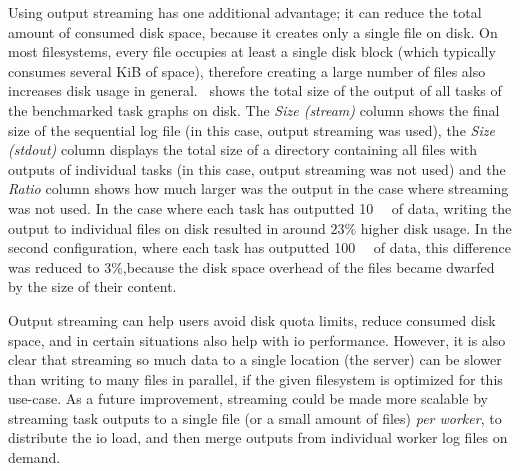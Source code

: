 Using output streaming has one additional advantage; it can reduce the total amount of consumed
disk space, because it creates only a single file on disk. On most filesystems, every file occupies
at least a single disk block (which typically consumes several KiB of space), therefore creating a
large number of files also increases disk usage in general.~ shows the total
size of the output of all tasks of the benchmarked task graphs on disk. The \emph{Size (stream)}
column shows the final size of the sequential log file (in this case, output streaming was used),
the \emph{Size (stdout)} column displays the total size of a directory containing all files with
outputs of individual tasks (in this case, output streaming was not used) and the
\emph{Ratio} column shows how much larger was the output in the case where streaming was
not used. In the case where each task has outputted \SI{10}{\kibi\byte} of data, writing the
output to individual files on disk resulted in around $23\%$ higher disk usage. In
the second configuration, where each task has outputted \SI{100}{\kibi\byte} of data, this
difference was reduced to $3\%$,because the disk space overhead of the files
became dwarfed by the size of their content.

Output streaming can help users avoid disk quota limits, reduce consumed disk space, and in certain
situations also help with \gls{io} performance. However, it is also clear that
streaming so much data to a single location (the server) can be slower than writing to many files
in parallel, if the given filesystem is optimized for this use-case. As a future improvement,
streaming could be made more scalable by streaming task outputs to a single file (or a small amount
of files) \emph{per worker}, to distribute the \gls{io} load, and then merge
outputs from individual worker log files on demand.


